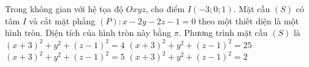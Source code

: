 \begin{ex}%
	Trong không gian với hệ tọa độ $Oxyz$, cho điểm $I(-3;0;1)$. Mặt cầu $(S)$ có tâm $I$ và cắt mặt phẳng $(P)\colon x-2y-2z-1=0$ theo một thiết diện là một hình tròn. Diện tích của hình tròn này bằng $\pi$. Phương trình mặt cầu $(S)$ là
	\choice
	{$(x+3)^2+y^2+(z-1)^2=4$}
	{$(x+3)^2+y^2+(z-1)^2=25$}
	{\True $(x+3)^2+y^2+(z-1)^2=5$}
	{$(x+3)^2+y^2+(z-1)^2=2$}
\end{ex}


